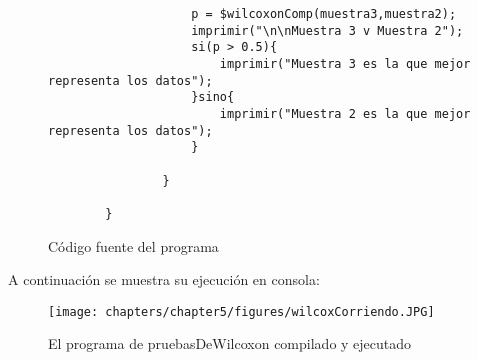 \begin{figure}[htbp]
\begin{lstlisting}
                    p = $wilcoxonComp(muestra3,muestra2);
                    imprimir("\n\nMuestra 3 v Muestra 2");
                    si(p > 0.5){
                        imprimir("Muestra 3 es la que mejor representa los datos");
                    }sino{
                        imprimir("Muestra 2 es la que mejor representa los datos");
                    }
            
                }
            
        }
    \end{lstlisting}
    \caption{Código fuente del programa}
    \label{fig:my_label}
\end{figure}
\FloatBarrier
A continuación se muestra su ejecución en consola:
\begin{figure}[htbp]
    \centering
    \texttt{[image: chapters/chapter5/figures/wilcoxCorriendo.JPG]}
    \caption{El programa de pruebasDeWilcoxon compilado y ejecutado}
    \label{fig:my_label}
\end{figure}